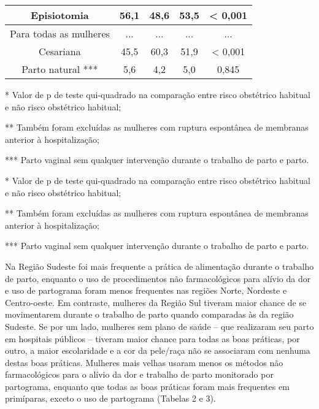 \documentclass{article}
\begin{document}
\begin{table}
\begin{tabulary}{\linewidth}{ C C C C C }
Episiotomia
& 56,1
& 48,6
& 53,5
& < 0,001
\\ \hline

Para todas as mulheres
& ...
& ...
& ...
& ...
\\ \hline

Cesariana
& 45,5
& 60,3
& 51,9
& < 0,001
\\ \hline

Parto natural ***
& 5,6
& 4,2
& 5,0
& 0,845
\\ \hline

\end{tabulary}
\caption*{\footnotesize }
\caption{}
\end{table}

* Valor de p de teste qui-quadrado na comparação entre risco
obstétrico habitual e não risco obstétrico habitual;

** Também foram excluídas as mulheres com ruptura espontânea de
membranas anterior à hospitalização;

*** Parto vaginal sem qualquer intervenção durante o trabalho de
parto e parto.

* Valor de p de teste qui-quadrado na comparação entre risco
obstétrico habitual e não risco obstétrico habitual;

** Também foram excluídas as mulheres com ruptura espontânea de
membranas anterior à hospitalização;

*** Parto vaginal sem qualquer intervenção durante o trabalho de
parto e parto.

Na Região Sudeste foi mais frequente a prática de alimentação durante o trabalho
de
parto, enquanto o uso de procedimentos não farmacológicos para alívio da dor e
uso
de partograma foram menos frequentes nas regiões Norte, Nordeste e Centro-oeste.
Em
contraste, mulheres da Região Sul tiveram maior chance de se movimentarem
durante o
trabalho de parto quando comparadas às da região Sudeste. Se por um lado,
mulheres
sem plano de saúde – que realizaram seu parto em hospitais públicos – tiveram
maior
chance para todas as boas práticas, por outro, a maior escolaridade e a cor da
pele/raça não se associaram com nenhuma destas boas práticas. Mulheres mais
velhas
usaram menos os métodos não farmacológicos para o alívio da dor e trabalho de
parto
monitorado por partograma, enquanto que todas as boas práticas foram mais
frequentes
em primíparas, exceto o uso de partograma (Tabelas
2 e 3).
\end{document}
